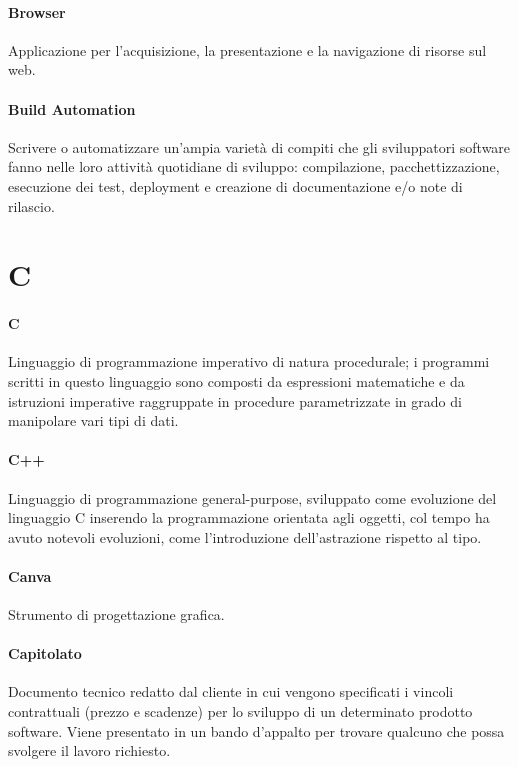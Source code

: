 \documentclass[]{article}
\begin{document}
	\paragraph*{Browser}
	Applicazione per l'acquisizione, la presentazione e la navigazione di risorse sul web.

	\paragraph*{Build Automation}
	Scrivere o automatizzare un'ampia varietà di compiti che gli sviluppatori software fanno nelle loro attività quotidiane di sviluppo: compilazione, pacchettizzazione, esecuzione dei test, deployment e creazione di documentazione e/o note di rilascio.

	\newpage

	\section*{C}

	\paragraph*{C}
	Linguaggio di programmazione imperativo di natura procedurale; i programmi scritti in questo linguaggio sono composti da espressioni matematiche e da istruzioni imperative raggruppate in procedure parametrizzate in grado di manipolare vari tipi di dati.

	\paragraph*{C++}
	Linguaggio di programmazione general-purpose, sviluppato come evoluzione del linguaggio C inserendo la programmazione orientata agli oggetti, col tempo ha avuto notevoli evoluzioni, come l'introduzione dell'astrazione rispetto al tipo.

	\paragraph*{Canva}
	Strumento di progettazione grafica.

	\paragraph*{Capitolato}
	Documento tecnico redatto dal cliente in cui vengono specificati i vincoli contrattuali	(prezzo e scadenze) per lo sviluppo di un determinato prodotto software. Viene presentato in un bando d'appalto per trovare qualcuno che possa svolgere il lavoro richiesto.
	
\end{document}

